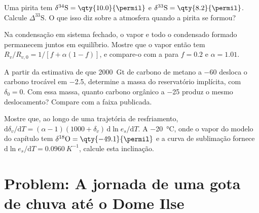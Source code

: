 \begin{exercise}[$\star\star$]\label{exo:b3:stable-isotopes:9}
Uma pirita tem $\delta^{34}\mathrm S = \qty{10.0}{\permil}$ e $\delta^{33}\mathrm S =
\qty{8.2}{\permil}$. Calcule $\Delta^{33}\mathrm S$. O que isso diz sobre a
atmosfera quando a pirita se formou?
\end{exercise}

\begin{exercise}[$\star\star\star$]\label{exo:b3:stable-isotopes:10}
Na condensação em sistema fechado, o vapor e todo o condensado formado permanecem
juntos em equilíbrio. Mostre que o vapor então tem $R_v/R_{v,0} = 1/[f +
\alpha(1 - f)]$, e compare-o com a  para $f = 0.2$ e
$\alpha = 1.01$.
\end{exercise}

\begin{exercise}[$\star\star\star$]\label{exo:b3:stable-isotopes:11}
A partir da estimativa de que \qty{2000}{Gt} de carbono de metano a
\qty{-60}{\permil} desloca o carbono trocável em \qty{-2.5}{\permil},
determine a massa do reservatório implícita, com $\delta_0 = 0$. Com essa massa, quanto
carbono orgânico a \qty{-25}{\permil} produz o mesmo deslocamento? Compare com a
faixa publicada.
\end{exercise}

\begin{exercise}[$\star\star\star$]\label{exo:b3:stable-isotopes:12}
Mostre que, ao longo de uma trajetória de resfriamento, $\mathrm d\delta_v/\mathrm dT = (\alpha - 1)(1000 +
\delta_v)\,\mathrm d\ln e_s/\mathrm dT$. A \qty{-20}{\celsius}, onde o
vapor do modelo do capítulo tem $\delta^{18}\mathrm O = \qty{-49.1}{\permil}$
e a curva de sublimação fornece $\mathrm d\ln e_s/\mathrm dT =
\qty{0.0960}{K^{-1}}$, calcule esta inclinação.
\end{exercise}

\section{Problem: A jornada de uma gota de chuva até o Dome Ilse}

